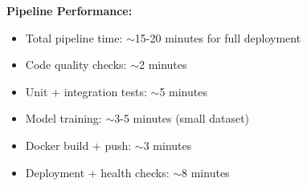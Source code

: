 \textbf{Pipeline Performance:}
\begin{itemize}
    \item Total pipeline time: $\sim$15-20 minutes for full deployment
    \item Code quality checks: $\sim$2 minutes
    \item Unit + integration tests: $\sim$5 minutes
    \item Model training: $\sim$3-5 minutes (small dataset)
    \item Docker build + push: $\sim$3 minutes
    \item Deployment + health checks: $\sim$8 minutes
\end{itemize}
